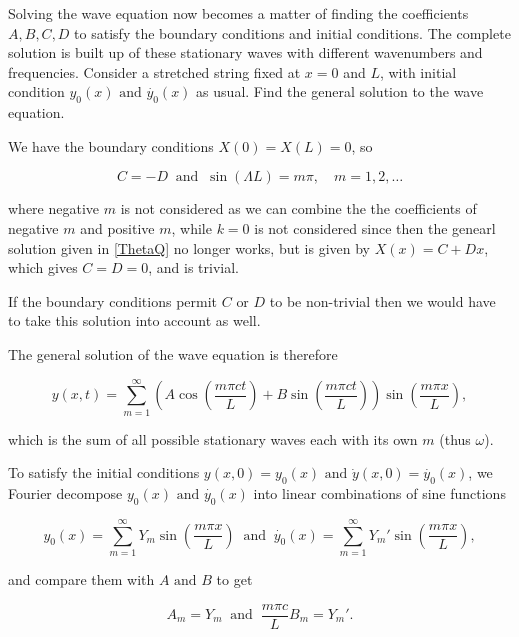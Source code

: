 \documentclass[a4paper,12pt]{report}
\begin{document}
Solving the wave equation now becomes a matter of finding the coefficients \(A, B, C, D\) to satisfy the boundary conditions and initial conditions. The complete solution is built up of these stationary waves with different wavenumbers and frequencies.
{Consider a stretched string fixed at \(x=0\) and \(L\), with initial condition \(y_0 (x) \text { and }  \dot{y_0 }(x) \) as usual. Find the general solution to the wave equation. }
{We have the boundary conditions \(X(0) = X(L) = 0\), so

\begin{equation}
	C = - D ~\text { and }~ \sin (\Lambda L) = m \pi , \quad m = 1,2,\ldots 
\end{equation}

where negative \(m\) is not considered as we can combine the the coefficients of negative \(m\) and positive \(m\), while \(k = 0\) is not considered since then the genearl solution given in \cref{ThetaQ} no longer works, but is given by \(X(x) = C + Dx\), which gives \(C = D = 0\), and is trivial.

If the boundary conditions permit \(C \text { or } D\) to be non-trivial then we would have to take this solution into account as well. 

The general solution of the wave equation is therefore

\begin{equation}
	y(x,t) = \sum_{m=1}^{\infty}\left( A\cos \left( \frac{m \pi ct}{L}  \right) + B  \sin \left( \frac{m \pi ct}{L}  \right)  \right) \sin \left( \frac{m \pi x}{L}  \right),
\end{equation}

which is the sum of all possible stationary waves each with its own \(m\) (thus \(\omega \)).

To satisfy the initial conditions \(y(x,0) = y_0 (x) \text { and } \dot{y}(x,0) = \dot{y_0 }(x)  \), we Fourier decompose \(y_0 (x) \text { and } \dot{y_0 }(x) \) into linear combinations of sine functions 

\begin{equation}
	y_0 (x) = \sum_{m=1}^{\infty} Y_{m}\sin \left( \frac{m\pi x}{L}  \right) ~\text { and }~ \dot{y_0 }(x) = \sum_{m=1}^{\infty} Y_{m}' \sin \left( \frac{m \pi x}{L}  \right),   
\end{equation}

and compare them with \(A \text { and } B \) to get

\begin{equation}
	A_{m} = Y_{m} ~\text { and }~ \frac{m\pi c}{L} B_{m} = Y_{m}'.
\end{equation}}
\end{document}
